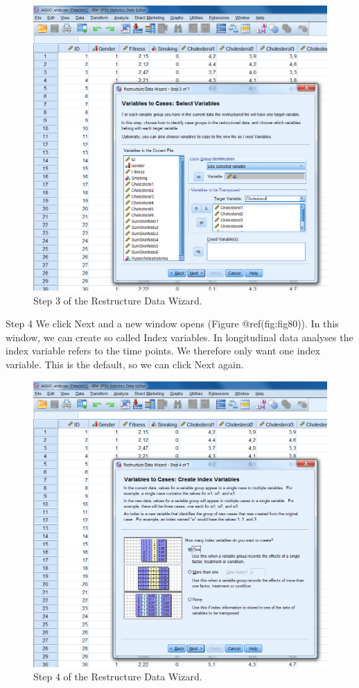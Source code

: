 \documentclass[
]{book}
\begin{document}
\begin{figure}

{\centering \includegraphics[width=0.9\linewidth]{images/fig7.9} 

}

\caption{Step 3 of the Restructure Data Wizard.}\label{fig:fig79}
\end{figure}

Step 4 We click Next and a new window opens (Figure @ref(fig:fig80)). In
this window, we can create so called Index variables. In longitudinal
data analyses the index variable refers to the time points. We therefore
only want one index variable. This is the default, so we can click Next
again.

\begin{figure}

{\centering \includegraphics[width=0.9\linewidth]{images/fig7.10} 

}

\caption{Step 4 of the Restructure Data Wizard.}\label{fig:fig80}
\end{figure}
\end{document}
